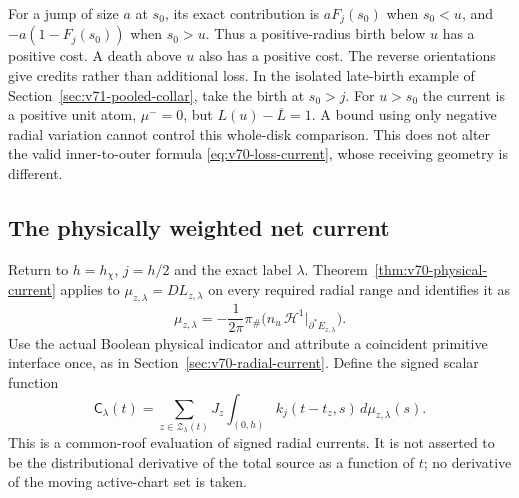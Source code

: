 For a jump of size $a$ at $s_0$, its exact contribution is
$aF_j(s_0)$ when $s_0<u$, and $-a(1-F_j(s_0))$ when $s_0>u$.
Thus a positive-radius birth below $u$ has a positive cost. A death
above $u$ also has a positive cost. The reverse orientations give
credits rather than additional loss. In the isolated late-birth
example of Section~\ref{sec:v71-pooled-collar}, take the birth at
$s_0>j$. For $u>s_0$ the current is a positive unit atom,
$\mu^-=0$, but $L(u)-\overline L=1$. A bound using only negative
radial variation cannot control this whole-disk comparison. This does
not alter the valid inner-to-outer formula
\eqref{eq:v70-loss-current}, whose receiving geometry is different.

\subsection{The physically weighted net current}
Return to $h=h_\chi$, $j=h/2$ and the exact label $\lambda$.
Theorem~\ref{thm:v70-physical-current} applies to
$\mu_{z,\lambda}=DL_{z,\lambda}$ on every required radial
range and identifies it as
\begin{equation}\label{eq:v71-physical-current-input}
 \mu_{z,\lambda}
 =-\frac1{2\pi}\pi_\#
    \bigl(n_u\,\mathcal H^1|_{\partial^*E_{z,\lambda}}\bigr).
\end{equation}
Use the actual Boolean physical indicator and attribute a coincident
primitive interface once, as in Section~\ref{sec:v70-radial-current}.
Define the signed scalar function
\begin{equation}\label{eq:v71-net-current}
 \mathsf C_\lambda(t)=
 \sum_{z\in\mathcal Z_\lambda(t)}J_z
       \int_{(0,h)}k_j(t-t_z,s)\,d\mu_{z,\lambda}(s).
\end{equation}
This is a common-roof evaluation of signed radial currents. It is not
asserted to be the distributional derivative of the total source
as a function of $t$; no derivative of the moving active-chart set
is taken.

